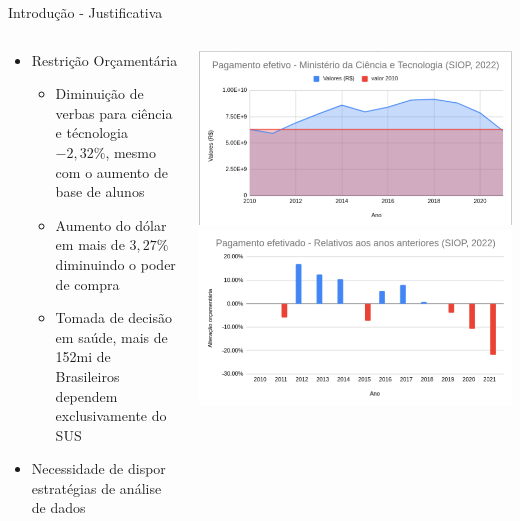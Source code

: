 \documentclass[10pt,brazil]{beamer}
\theoremstyle{definition}
\begin{document}
\begin{frame}{Introdução - Justificativa}
  \begin{columns}
    \begin{column}{0.5\textwidth}
      \begin{itemize}
        \item Restrição Orçamentária
              \begin{itemize}
                \item Diminuição de verbas para ciência e técnologia $-2,32\%$, mesmo com o aumento de base de alunos
                \item Aumento do dólar em mais de $3,27\%$ diminuindo o poder de compra
                \item Tomada de decisão em saúde, mais de 152mi de Brasileiros dependem exclusivamente do SUS %
              \end{itemize}
        \item Necessidade de dispor estratégias de análise de dados
      \end{itemize}
    \end{column}
    \begin{column}{0.5\textwidth}  %
      \begin{center}
        \includegraphics[width=1\textwidth]{orcamento.png}
        \includegraphics[width=1\textwidth]{variacaoorcamentaria.png}
      \end{center}
    \end{column}
  \end{columns}
\end{frame}
\end{document}
